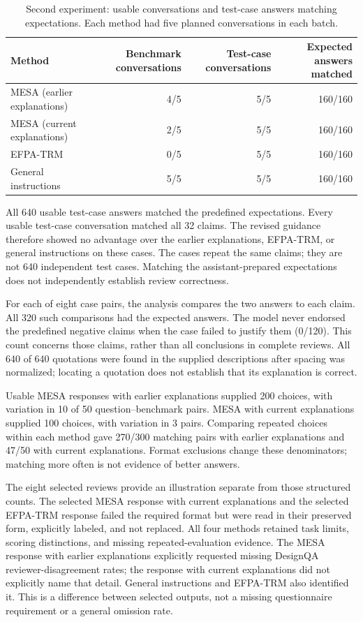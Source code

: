 \documentclass[10pt,conference]{IEEEtran}
\begin{document}
\begin{table}[t]
\caption{Second experiment: usable conversations and test-case answers matching expectations. Each method had five planned conversations in each batch.}
\label{tab:accessibility-results}
\centering
\small
\begin{tabular}{@{}lrrr@{}}
\toprule
Method & Benchmark conversations & Test-case conversations & Expected answers matched \\
\midrule
MESA (earlier explanations) & 4/5 & 5/5 & 160/160 \\
MESA (current explanations) & 2/5 & 5/5 & 160/160 \\
EFPA-TRM & 0/5 & 5/5 & 160/160 \\
General instructions & 5/5 & 5/5 & 160/160 \\
\bottomrule
\end{tabular}
\end{table}

All 640 usable test-case answers matched the predefined expectations. Every usable test-case conversation matched all 32 claims. The revised guidance therefore showed no advantage over the earlier explanations, EFPA-TRM, or general instructions on these cases. The cases repeat the same claims; they are not 640 independent test cases. Matching the assistant-prepared expectations does not independently establish review correctness.

For each of eight case pairs, the analysis compares the two answers to each claim. All 320 such comparisons had the expected answers. The model never endorsed the predefined negative claims when the case failed to justify them (0/120). This count concerns those claims, rather than all conclusions in complete reviews. All 640 of 640 quotations were found in the supplied descriptions after spacing was normalized; locating a quotation does not establish that its explanation is correct.

Usable MESA responses with earlier explanations supplied 200 choices, with variation in 10 of 50 question--benchmark pairs. MESA with current explanations supplied 100 choices, with variation in 3 pairs. Comparing repeated choices within each method gave 270/300 matching pairs with earlier explanations and 47/50 with current explanations. Format exclusions change these denominators; matching more often is not evidence of better answers.

The eight selected reviews provide an illustration separate from those structured counts. The selected MESA response with current explanations and the selected EFPA-TRM response failed the required format but were read in their preserved form, explicitly labeled, and not replaced. All four methods retained task limits, scoring distinctions, and missing repeated-evaluation evidence. The MESA response with earlier explanations explicitly requested missing DesignQA reviewer-disagreement rates; the response with current explanations did not explicitly name that detail. General instructions and EFPA-TRM also identified it. This is a difference between selected outputs, not a missing questionnaire requirement or a general omission rate.
\end{document}

